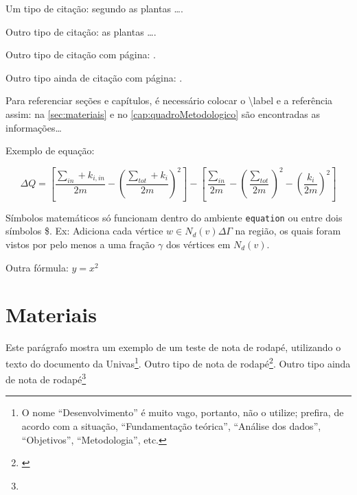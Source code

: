 \par Um tipo de citação: segundo  as plantas \ldots.

\par Outro tipo de citação: as plantas \ldots \cite{correa2003plantas}.

\par Outro tipo de citação com página: \cite[p. 13]{correa2003plantas}.
\par Outro tipo ainda de citação com página:  .

\par Para referenciar seções e capítulos, é necessário colocar o \textbackslash label e a referência assim: na \autoref{sec:materiais} e no \autoref{cap:quadroMetodologico} são encontradas as informações\ldots

\par Exemplo de equação:

\begin{equation}
 \Delta Q = 
 \left[
 \frac{\sum_{in} + k_{i,in}}{2m} - 
 \left(
 \frac{\sum_{tot} + k_i}{2m}
 \right)^2
 \right] -
 \left[
 \frac{\sum_{in}}{2m} - 
 \left(\frac{\sum_{tot}}{2m}
 \right)^2 - 
 \left(\frac{k_i}{2m}
 \right)^2
 \right]
\end{equation}


\par Símbolos matemáticos só funcionam dentro do ambiente \texttt{equation} ou entre dois símbolos \$. Ex: Adiciona cada vértice $w \in N_d(v) \Delta \Gamma$ na região, os quais foram vistos por pelo menos a uma fração $\gamma$ dos vértices em $N_d(v)$.

\par Outra fórmula: $y=x^2$

\section{Materiais}
\label{sec:materiais}

\par Este parágrafo mostra um exemplo de um teste de nota de rodapé, utilizando o texto do documento da Univas\footnote{O nome “Desenvolvimento” é muito vago, portanto, não o utilize; prefira, de acordo com a situação, ``Fundamentação teórica'', ``Análise dos dados'', ``Objetivos'', ``Metodologia'', etc. }. Outro tipo de nota de rodapé\footnote{\cite{correa2003plantas}}.  Outro tipo ainda de nota de rodapé\footnote{}


